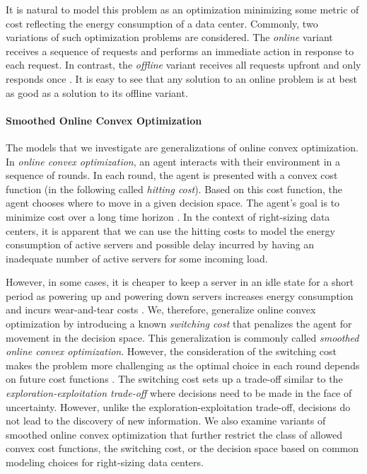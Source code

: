 It is natural to model this problem as an optimization minimizing some metric of cost reflecting the energy consumption of a data center. Commonly, two variations of such optimization problems are considered. The \emph{online} variant receives a sequence of requests and performs an immediate action in response to each request. In contrast, the \emph{offline} variant receives all requests upfront and only responds once \cite{Karp1992}. It is easy to see that any solution to an online problem is at best as good as a solution to its offline variant.

\paragraph{Smoothed Online Convex Optimization} The models that we investigate are generalizations of online convex optimization. In \emph{online convex optimization}, an agent interacts with their environment in a sequence of rounds. In each round, the agent is presented with a convex cost function (in the following called \emph{hitting cost}). Based on this cost function, the agent chooses where to move in a given decision space. The agent's goal is to minimize cost over a long time horizon \cite{Hazan2019}. In the context of right-sizing data centers, it is apparent that we can use the hitting costs to model the energy consumption of active servers and possible delay incurred by having an inadequate number of active servers for some incoming load.

However, in some cases, it is cheaper to keep a server in an idle state for a short period as powering up and powering down servers increases energy consumption and incurs wear-and-tear costs \cite{Lin2011}. We, therefore, generalize online convex optimization by introducing a known \emph{switching cost} that penalizes the agent for movement in the decision space. This generalization is commonly called \emph{smoothed online convex optimization}. However, the consideration of the switching cost makes the problem more challenging as the optimal choice in each round depends on future cost functions \cite{Chen2015}. The switching cost sets up a trade-off similar to the \emph{exploration-exploitation trade-off} where decisions need to be made in the face of uncertainty. However, unlike the exploration-exploitation trade-off, decisions do not lead to the discovery of new information. We also examine variants of smoothed online convex optimization that further restrict the class of allowed convex cost functions, the switching cost, or the decision space based on common modeling choices for right-sizing data centers.

